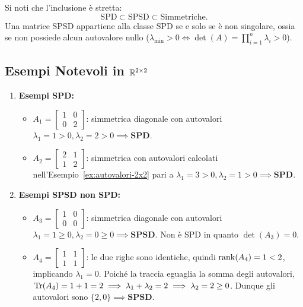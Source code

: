 Si noti che l'inclusione \`e stretta:
\begin{equation}
    \text{SPD} \subset \text{SPSD} \subset \text{Simmetriche}.
\end{equation}
Una matrice SPSD appartiene alla classe SPD se e solo se \`e non singolare, ossia se non possiede alcun autovalore nullo ($\lambda_{\min} > 0 \iff \det(A) = \prod_{i=1}^n \lambda_i > 0$).

\subsection{Esempi Notevoli in \texorpdfstring{$\mathbb{R}^{2 \times 2}$}{R\textasciicircum(2x2)}}

\begin{example}
\mbox{}\par\nopagebreak
\begin{enumerate}
    \item \textbf{Esempi SPD:}
    \begin{itemize}
        \item $A_1 = \begin{bmatrix} 1 & 0 \\ 0 & 2 \end{bmatrix}$: simmetrica diagonale con autovalori $\lambda_1 = 1 > 0, \lambda_2 = 2 > 0 \implies \mathbf{SPD}$.
        \item $A_2 = \begin{bmatrix} 2 & 1 \\ 1 & 2 \end{bmatrix}$: simmetrica con autovalori calcolati nell'Esempio~\ref{ex:autovalori-2x2} pari a $\lambda_1 = 3 > 0, \lambda_2 = 1 > 0 \implies \mathbf{SPD}$.
    \end{itemize}
    \item \textbf{Esempi SPSD non SPD:}
    \begin{itemize}
        \item $A_3 = \begin{bmatrix} 1 & 0 \\ 0 & 0 \end{bmatrix}$: simmetrica diagonale con autovalori $\lambda_1 = 1 \ge 0, \lambda_2 = 0 \ge 0 \implies \mathbf{SPSD}$. Non \`e SPD in quanto $\det(A_3) = 0$.
        \item $A_4 = \begin{bmatrix} 1 & 1 \\ 1 & 1 \end{bmatrix}$: le due righe sono identiche, quindi $\operatorname{rank}(A_4) = 1 < 2$, implicando $\lambda_1 = 0$. Poich\'e la traccia eguaglia la somma degli autovalori, $\operatorname{Tr}(A_4) = 1 + 1 = 2 \implies \lambda_1 + \lambda_2 = 2 \implies \lambda_2 = 2 \ge 0$. Dunque gli autovalori sono $\{2, 0\} \implies \mathbf{SPSD}$.

\end{itemize}
\end{enumerate}
\end{example}
